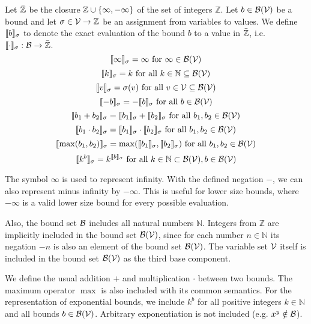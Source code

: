 \begin{definition}
  Let $\bar{\mathbb{Z}}$ be the closure $\mathbb{Z} \cup \lbrace \infty, -\infty \rbrace$ of the set of integers $\mathbb{Z}$.
  Let $b \in \mathcal{B}(\mathcal{V})$ be a bound and let $\sigma \in \mathcal{V} \rightarrow \mathbb{Z}$ be an assignment from variables to values.
  We define $\llbracket b \rrbracket_{\sigma}$ to denote the exact evaluation of the bound $b$ to a value in $\bar{\mathbb{Z}}$, i.e. $\llbracket \cdot \rrbracket_{\sigma}: \mathcal{B} \rightarrow \bar{\mathbb{Z}}$.
  \[ \llbracket \infty \rrbracket_{\sigma} = \infty \text{ for } \infty \in \mathcal{B}(\mathcal{V}) \]
  \[ \llbracket k \rrbracket_{\sigma} = k \text{ for all } k \in \mathbb{N} \subseteq \mathcal{B}(\mathcal{V}) \] 
  \[ \llbracket v \rrbracket_{\sigma} = \sigma(v) \text{ for all } v \in \mathcal{V} \subseteq \mathcal{B}(\mathcal{V}) \] 
  \[ \llbracket -b \rrbracket_{\sigma} = -\llbracket b \rrbracket_{\sigma} \text{ for all } b \in \mathcal{B}(\mathcal{V}) \] 
  \[ \llbracket b_1 + b_2 \rrbracket_{\sigma} = \llbracket b_1 \rrbracket_{\sigma} + \llbracket b_2 \rrbracket_{\sigma} \text{ for all } b_1, b_2 \in \mathcal{B}(\mathcal{V}) \] 
  \[ \llbracket b_1 \cdot b_2 \rrbracket_{\sigma} = \llbracket b_1 \rrbracket_{\sigma} \cdot \llbracket b_2 \rrbracket_{\sigma} \text{ for all } b_1, b_2 \in \mathcal{B}(\mathcal{V}) \] 
  \[ \llbracket \max(b_1, b_2) \rrbracket_{\sigma} = \max(\llbracket b_1 \rrbracket_{\sigma}, \llbracket b_2 \rrbracket_{\sigma}) \text{ for all } b_1, b_2 \in \mathcal{B}(\mathcal{V}) \]
  \[ \llbracket k^b \rrbracket_{\sigma} = k^{\llbracket b \rrbracket_{\sigma}} \text{ for all } k \in \mathbb{N} \subset \mathcal{B}(\mathcal{V}), b \in \mathcal{B}(\mathcal{V}) \]  
\end{definition}
The symbol $\infty$ is used to represent infinity.
With the defined negation $-$, we can also represent minus infinity by $-\infty$.
This is useful for lower size bounds, where $-\infty$ is a valid lower size bound for every possible evaluation.

Also, the bound set $\mathcal{B}$ includes all natural numbers $\mathbb{N}$.
Integers from $\mathbb{Z}$ are implicitly included in the bound set $\mathcal{B}(\mathcal{V})$, since for each number $n \in \mathbb{N}$ its negation $-n$ is also an element of the bound set $\mathcal{B}(\mathcal{V})$.
The variable set $\mathcal{V}$ itself is included in the bound set $\mathcal{B}(\mathcal{V})$ as the third base component.

We define the usual addition $+$ and multiplication $\cdot$ between two bounds.
The maximum operator $\max$ is also included with its common semantics.
For the representation of exponential bounds, we include $k^b$ for all positive integers $k \in \mathbb{N}$ and all bounds $b \in \mathcal{B}(\mathcal{V})$.
Arbitrary exponentiation is not included (e.g. $x^y \notin \mathcal{B}$).

